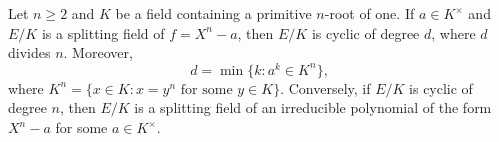 


\begin{proposition}
    Let $n\geq2$ and $K$ be a field containing a primitive $n$-root of one. If 
    $a\in K^{\times}$ and 
    $E/K$ is a splitting field of $f=X^n-a$, then $E/K$ is cyclic
    of degree $d$, where $d$ divides $n$. Moreover, 
    \[
    d=\min\{k:a^k\in K^n\},
    \]
    where $K^n=\{x\in K:x=y^n\text{ for some $y\in K$}\}$. 
    Conversely, 
    if $E/K$ is cyclic of degree $n$, then $E/K$ is a splitting
    field of an irreducible polynomial 
    of the form $X^n-a$ for some $a\in K^{\times}$. 
\end{proposition}

